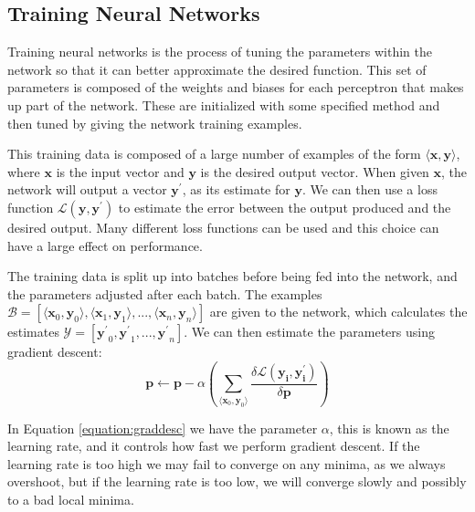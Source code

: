 \documentclass[12pt,a4paper,twoside,openright]{report}
\begin{document}
\subsection{Training Neural Networks}
Training neural networks is the process of tuning the parameters within the network so that it can better approximate the desired function. This set of parameters is composed of the weights and biases for each perceptron that makes up part of the network. These are initialized with some specified method and then tuned by giving the network training examples.
\newline
 
This training data is composed of a large number of examples of the form $\langle \mathbf{x}, \mathbf{y} \rangle$, where $\mathbf{x}$ is the input vector and $\mathbf{y}$ is the desired output vector. When given $\mathbf{x}$, the network will output a vector $\mathbf{y^\prime}$, as its estimate for $\mathbf{y}$. We can then use a loss function $\mathcal{L}(\mathbf{y}, \mathbf{y^\prime})$ to estimate the error between the output produced and the desired output. Many different loss functions can be used and this choice can have a large effect on performance.
\newline
 
The training data is split up into batches before being fed into the network, and the parameters adjusted after each batch. The examples $\mathcal{B} = [\langle \mathbf{x}_0, \mathbf{y}_0 \rangle, \langle \mathbf{x}_1, \mathbf{y}_1 \rangle, ..., \langle \mathbf{x}_n, \mathbf{y}_n \rangle]$ are given to the network, which calculates the estimates  $\mathcal{Y} = [\mathbf{y^\prime}_0, \mathbf{y^\prime}_1, ..., \mathbf{y^\prime}_n]$. We can then estimate the parameters using gradient descent: 
\begin{equation}
    \label{equation:graddesc}
    \mathbf{p} \leftarrow \mathbf{p} - \alpha (\sum_{\langle \mathbf{x}_0, \mathbf{y}_0 \rangle} \frac{\delta \mathcal{L}(\mathbf{y_i}, \mathbf{y_i^\prime})}{\delta \mathbf{p}})
\end{equation}
 
In Equation \ref{equation:graddesc} we have the parameter $\alpha$, this is known as the learning rate, and it controls how fast we perform gradient descent. If the learning rate is too high we may fail to converge on any minima, as we always overshoot, but if the learning rate is too low, we will converge slowly and possibly to a bad local minima.
\newline
 
\end{document}
